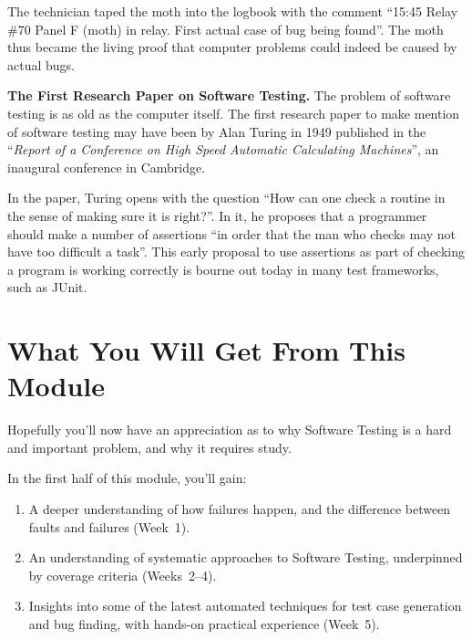 The technician taped the moth into the logbook with the comment ``15:45 Relay
\#70 Panel F (moth) in relay. First actual case of bug being found''. The moth
thus became the living proof that computer problems could indeed be caused by
actual bugs.



{\bf The First Research Paper on Software Testing.}
%
The problem of software testing is as old as the computer itself. The first
research paper to make mention of software testing may have been by Alan Turing
in 1949 published in the ``{\it Report of a Conference on High Speed Automatic
Calculating Machines}'', an inaugural conference in Cambridge.

In the paper, Turing opens with the question ``How can one check a routine in
the sense of making sure it is right?''. In it, he proposes that a programmer
should make a number of assertions ``in order that the man who checks may not
have too difficult a task''. This early proposal to use assertions as part of
checking a program is working correctly is bourne out today in many test
frameworks, such as JUnit.




\section{What You Will Get From This Module}

Hopefully you'll now have an appreciation as to why Software Testing is a hard
and important problem, and why it requires study.


In the first half of this module, you'll gain:

\begin{enumerate}

    \item A deeper understanding of how failures happen, and the difference
    between faults and failures (Week~1).

    \item An understanding of systematic approaches to Software Testing,
    underpinned by coverage criteria (Weeks~2--4).

    \item Insights into some of the latest automated techniques for test case
    generation and bug finding, with hands-on practical experience (Week~5).

\end{enumerate}

